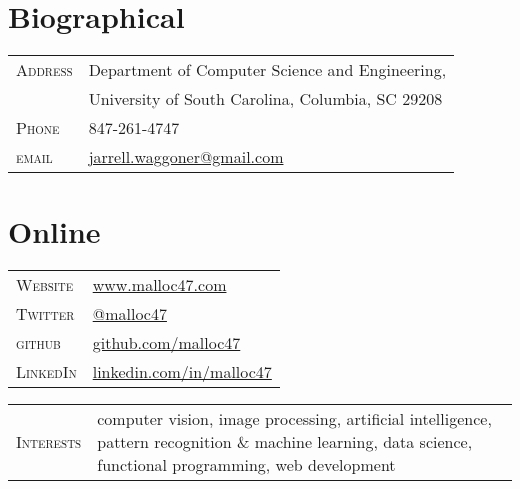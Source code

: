 \documentclass[10pt]{article}
\begin{document}
\pagestyle{empty}

\par{\bigskip\par}

\begin{multicols}{2}
\setlength{\parskip}{0pt}
\section{Biographical}
\begin{tabularx}{\linewidth}{@{}l X@{}}
  \textsc{Address}	& \footnotesize{Department of Computer Science and Engineering,} \\
  & \footnotesize{University of South Carolina, Columbia, SC 29208} \\
  \textsc{Phone}       & 847-261-4747\\
  \textsc{email}       & \href{mailto:jarrell.waggoner@gmail.com}{jarrell.waggoner@gmail.com} \\
\end{tabularx}

\vfill
\columnbreak

\section{Online}
\begin{tabularx}{\linewidth}{@{}l X@{}}
  \textsc{Website}	& \href{http://www.malloc47.com}{www.malloc47.com} \\
  \textsc{Twitter}     & \href{https://twitter.com/malloc47}{@malloc47} \\
  \textsc{github}      & \href{http://www.github.com/malloc47}{github.com/malloc47}\\
  \textsc{LinkedIn}    & \href{http://www.linkedin.com/in/malloc47}{linkedin.com/in/malloc47} \\
\end{tabularx}

\end{multicols}

\begin{tabularx}{\textwidth}{@{}l X}
  \textsc{Interests} & computer vision, image processing, artificial
  intelligence, pattern recognition \& machine learning, data science,
  functional programming, web development
\end{tabularx}

\newcommand{\degree}[4]{\textsc{#1} & \textbf{#2} & \textsc{#3} & \textbf{#4}\\}
\end{document}
